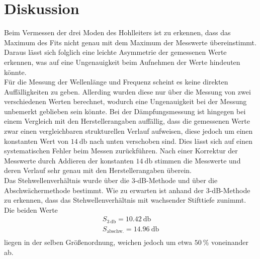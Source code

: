 \section{Diskussion}
\label{sec:Diskussion}

Beim Vermessen der drei Moden des Hohlleiters ist zu erkennen, dass das Maximum des Fits nicht genau mit dem Maximum der Messwerte übereinstimmt.
Daraus lässt sich folglich eine leichte Asymmetrie der gemessenen Werte erkennen, was auf eine Ungenauigkeit beim Aufnehmen der Werte hindeuten könnte.
\\
Für die Messung der Wellenlänge und Frequenz scheint es keine direkten Auffälligkeiten zu geben. Allerding wurden diese nur über die Messung von zwei verschiedenen Werten berechnet, wodurch eine Ungenauigkeit bei der Messung unbemerkt geblieben sein könnte. 
Bei der Dämpfungsmessung ist 
hingegen bei einem Vergleich mit den Herstellerangaben auffällig, dass die gemessenen Werte zwar einen vergleichbaren strukturellen Verlauf 
aufweisen, diese jedoch um einen konstanten Wert von $\SI{14}{\decibel}$ nach unten verschoben sind. Dies lässt sich auf einen systematischen 
Fehler beim Messen zurückführen. Nach einer Korrektur der Messwerte durch Addieren der konstanten $\SI{14}{\decibel}$ stimmen die Messwerte und 
deren Verlauf sehr genau mit den Herstellerangaben überein. 
\\
Das Stehwellenverhältnis wurde über die 3-dB-Methode und über die Abschwächermethode bestimmt. Wie zu erwarten ist anhand der 3-dB-Methode zu erkennen, 
dass das Stehwellenverhältnis mit wachsender Stifttiefe zunimmt. 
Die beiden Werte 
\begin{align*}
    S_{\SI{3}{\decibel}} = \SI{10.42}{\decibel} \\
    S_{\text{abschw.}} = \SI{14.96}{\decibel} \\
\end{align*}
liegen in der selben Größenordnung, weichen jedoch um etwa $\SI{50}{\percent}$ voneinander ab. 